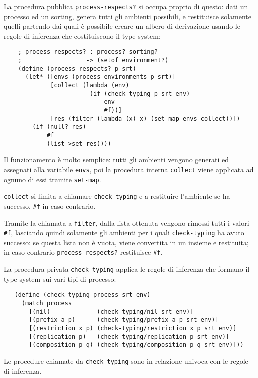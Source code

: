La procedura pubblica \lstinline{process-respects?} si occupa proprio
di questo: dati un processo ed un sorting, genera tutti gli ambienti
possibili, e restituisce solamente quelli partendo dai quali \`e
possibile creare un albero di derivazione usando le regole di inferenza
che costituiscono il type system:

\begin{lstlisting}
    ; process-respects? : process? sorting?
    ;                  -> (setof environment?)
    (define (process-respects? p srt)
      (let* ([envs (process-environments p srt)]
             [collect (lambda (env)
                        (if (check-typing p srt env)
                            env
                            #f))]
             [res (filter (lambda (x) x) (set-map envs collect))])
        (if (null? res)
            #f
            (list->set res))))
\end{lstlisting}

Il funzionamento \`e molto semplice: tutti gli ambienti vengono generati
ed assegnati alla variabile \lstinline{envs}, poi la procedura interna
\lstinline{collect} viene applicata ad ognuno di essi tramite
\lstinline{set-map}.

\lstinline{collect} si limita a chiamare \lstinline{check-typing} e a
restituire l'ambiente se ha successo, \lstinline{#f} in caso contrario.

Tramite la chiamata a \lstinline{filter}, dalla lista ottenuta vengono
rimossi tutti i valori \lstinline{#f}, lasciando quindi solamente gli
ambienti per i quali \lstinline{check-typing} ha avuto successo: se
questa lista non \`e vuota, viene convertita in un insieme e restituita;
in caso contrario \lstinline{process-respects?} restituisce
\lstinline{#f}.

La procedura privata \lstinline{check-typing} applica le regole di
inferenza che formano il type system sui vari tipi di processo:

\begin{lstlisting}
   (define (check-typing process srt env)
     (match process
       [(nil)             (check-typing/nil srt env)]
       [(prefix a p)      (check-typing/prefix a p srt env)]
       [(restriction x p) (check-typing/restriction x p srt env)]
       [(replication p)   (check-typing/replication p srt env)]
       [(composition p q) (check-typing/composition p q srt env)]))
\end{lstlisting}

Le procedure chiamate da \lstinline{check-typing} sono in relazione
univoca con le regole di inferenza.

